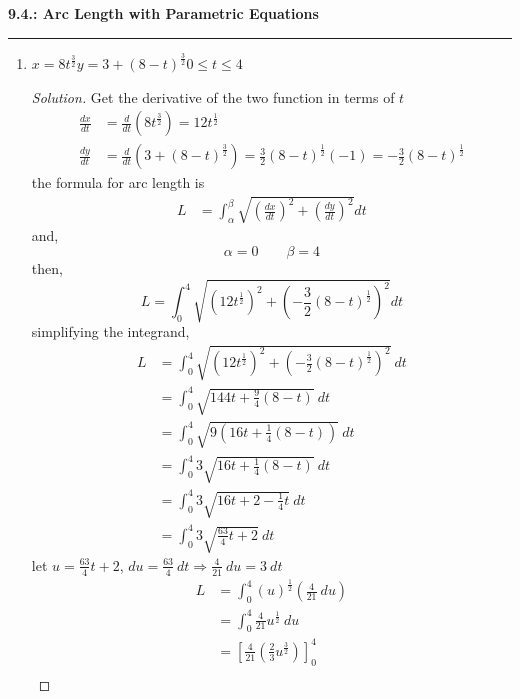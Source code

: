\documentclass[12pt]{article}
\begin{document}
	\noindent
	{\Large \textbf{9.4.: Arc Length with Parametric Equations}} \\
	\hrule
	
		\begin{enumerate}[label=\arabic*.]
			\item \(x=8t^{\frac{3}{2}}\)\qquad\(y=3+(8-t)^{\frac{3}{2}}\)\qquad\(0\leq t\leq 4\)
		
			\begin{proof}[Solution]
				Get the derivative of the two function in terms of \(t\)
				\begin{align*}
					\frac{dx}{dt} & = \frac{d}{dt}\left(8t^{\frac{3}{2}}\right) = 12t^{\frac{1}{2}} \\
					\frac{dy}{dt} & = \frac{d}{dt}\left(3+\left(8-t\right)^{\frac{3}{2}}\right) = \frac{3}{2}\left(8-t\right)^{\frac{1}{2}}(-1) = -\frac{3}{2}(8-t)^{\frac{1}{2}}
				\end{align*}
				the formula for arc length is
				\begin{align}
					L & = \int_{\alpha}^{\beta} \sqrt{\left(\frac{dx}{dt}\right)^2+\left(\frac{dy}{dt}\right)^2}dt
				\label{eqn:arclengthformula}
				\end{align}
				and,
				\[\alpha = 0\qquad\beta = 4\]
				then,
				\[L = \int_0^4 \sqrt{\left(12t^{\frac{1}{2}}\right)^2+\left(-\frac{3}{2}(8-t)^{\frac{1}{2}}\right)^2}dt\]
				simplifying the integrand,
				\begin{align*}
					L & = \int_0^4 \sqrt{\left(12t^{\frac{1}{2}}\right)^2+\left(-\frac{3}{2}(8-t)^{\frac{1}{2}}\right)^2}~dt \\
					& = \int_0^4 \sqrt{144t+\frac{9}{4}(8-t)}~dt \\
					& = \int_0^4 \sqrt{9\left(16t+\frac{1}{4}(8-t)\right)}~dt \\
					& = \int_0^4 3\sqrt{16t+\frac{1}{4}(8-t)}~dt \\
					& = \int_0^4 3\sqrt{16t+2-\frac{1}{4}t}~dt \\
					& = \int_0^4 3\sqrt{\frac{63}{4}t+2}~dt
				\end{align*}
				let \(u=\frac{63}{4}t+2\), \(du = \frac{63}{4}~dt \Rightarrow \frac{4}{21}~du = 3~dt\)
				\begin{align*}
					L & = \int_0^4 \left(u\right)^{\frac{1}{2}}\left(\frac{4}{21}~du\right) \\
					& = \int_0^4 \frac{4}{21} u^{\frac{1}{2}}~du \\
					& = \left[\frac{4}{21}\left(\frac{2}{3}u^{\frac{3}{2}}\right)\right]_0^4 \\

\end{align*}
\end{proof}
\end{enumerate}
\end{document}
